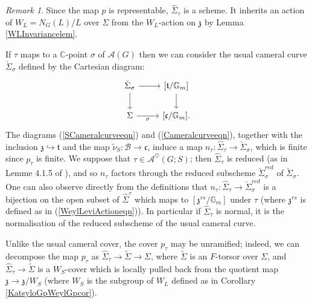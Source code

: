 \documentclass{amsart}
\theoremstyle{remark}
\newtheorem{remark}[theorem]{Remark}
\numberwithin{theorem}{section}
\numberwithin{equation}{section}
\begin{document}
\begin{remark}\label{SCameralcurvermk}
    Since the map $p$ is representable, $\hat{\Sigma}_{\tau}$ is a scheme. It inherits an action of $W_L=N_G(L)/L$ over $\Sigma$ from the $W_L$-action on $\mathfrak{z}$ by Lemma \ref{WLInvariancelem}.
    
    If $\tau$ maps to a $\mathbb{C}$-point $\sigma$ of $\mathcal A(G)$ then we can consider the usual cameral curve $\check{\Sigma}_{\sigma}$ defined by the Cartesian diagram:
    \begin{equation}\label{Cameralcurveeqn}
\begin{tikzcd}
\check{\Sigma}_\sigma \arrow[d] \arrow[r] & {[\mathfrak{t}/\mathbb{G}_m]} \arrow[d] \\
\Sigma \arrow[r, "\sigma"']       & {[\mathfrak{c}/\mathbb{G}_m]}.       
\end{tikzcd}
    \end{equation}
    The diagrams (\ref{SCameralcurveeqn}) and (\ref{Cameralcurveeqn}), together with the inclusion $\mathfrak{z} \hookrightarrow \mathfrak{t}$ and the map $\tilde{\nu}_S:\mathcal B \rightarrow \mathfrak{c}$, induce a map $n_\tau:\hat{\Sigma}_\tau \rightarrow \check{\Sigma}_\sigma$, which is finite since $p_\tau$ is finite. We suppose that $\tau \in \mathcal A^\heartsuit(G;S)$; then $\hat{\Sigma}_\tau$ is reduced (as in Lemme 4.1.5 of \cite{Ngo2}), and so $n_\tau$ factors through the reduced subscheme $\check{\Sigma}_\sigma^{red}$ of $\check{\Sigma}_\sigma$. One can also observe directly from the definitions that $n_\tau:\hat{\Sigma}_\tau \rightarrow \check{\Sigma}_\sigma^{red}$ is a bijection on the open subset of $\hat{\Sigma}^\tau$ which maps to $[\mathfrak{z}^{rs}/\mathbb{G}_m]$ under $\hat{\tau}$ (where $\mathfrak{z}^{rs}$ is defined as in (\ref{WeylLeviActioneqn})). In particular if $\hat{\Sigma}_\tau$ is normal, it is the normalisation of the reduced subscheme of the usual cameral curve.
    
    Unlike the usual cameral cover, the cover $p_\tau$ may be unramified; indeed, we can decompose the map $p_\tau$ as $\hat{\Sigma}_\tau \rightarrow \tilde{\Sigma} \rightarrow \Sigma$, where $\tilde{\Sigma}$ is an $F$-torsor over $\Sigma$, and $\hat{\Sigma}_\tau \rightarrow \tilde{\Sigma}$ is a $W_S$-cover which is locally pulled back from the quotient map $\mathfrak{z}\rightarrow \mathfrak{z}/W_S$ (where $W_S$ is the subgroup of $W_L$ defined as in Corollary \ref{KatsyloGpWeylGpcor}).
\end{remark}
\end{document}
